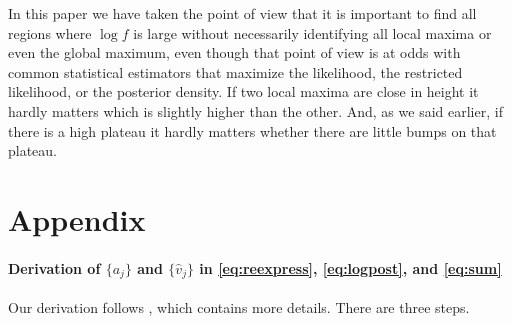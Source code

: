 \documentclass{report}
\begin{document}
In this paper we have taken the point of view that it is important to find all regions where $\log f$ is large without necessarily identifying all local maxima or even the global maximum, even though that point of view is at odds with common statistical estimators that maximize the likelihood, the restricted likelihood, or the posterior density.  If two local maxima are close in height it hardly matters which is slightly higher than the other.  And, as we said earlier, if there is a high plateau it hardly matters whether there are little bumps on that plateau.

\section{Appendix}
\paragraph{Derivation of $\{a_j\}$ and $\{\hat v_j\}$ in \eqref{eq:reexpress}, \eqref{eq:logpost}, and \eqref{eq:sum}}  Our derivation follows \cite{hodges:2013},
which contains more details.  There are three steps.
\end{document}
